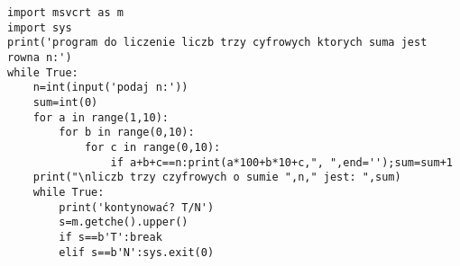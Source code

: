 \begin{verbatim}
import msvcrt as m
import sys
print('program do liczenie liczb trzy cyfrowych ktorych suma jest rowna n:')
while True:
    n=int(input('podaj n:'))
    sum=int(0)
    for a in range(1,10):
        for b in range(0,10):
            for c in range(0,10):
                if a+b+c==n:print(a*100+b*10+c,", ",end='');sum=sum+1
    print("\nliczb trzy czyfrowych o sumie ",n," jest: ",sum)
    while True:
        print('kontynować? T/N')
        s=m.getche().upper()
        if s==b'T':break
        elif s==b'N':sys.exit(0)
\end{verbatim}